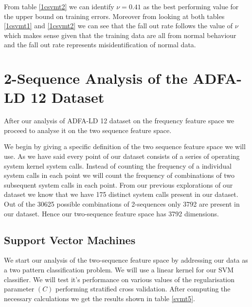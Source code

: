 \documentclass[reqno,openany,12pt]{amsbook}
\begin{document}
From table \ref{1csvmt2} we can identify $\nu=0.41$ as the best performing value for the upper bound on training errors. Moreover from looking at both tables \ref{1csvmt1} and \ref{1csvmt2} we can see that the fall out rate follows the value of $\nu$ which makes sense given that the training data are all from normal behaviour and the fall out rate represents misidentification of normal data.



\chapter{2-Sequence Analysis of the ADFA-LD 12 Dataset}

After our analysis of ADFA-LD 12 dataset on the frequency feature space we proceed to analyse it on the two sequence feature space. 

We begin by giving a specific definition of the two sequence feature space we will use. As we have said every point of our dataset consists of a series of operating system kernel system calls. Instead of counting the frequency of a individual system calls in each point we will count the frequency of combinations of two subsequent system calls in each point. From our previous explorations of our dataset we know that we have 175 distinct system calls present in our dataset. Out of the 30625 possible combinations of 2-sequences only 3792 are present in our dataset. Hence our two-sequence feature space has 3792 dimensions.



\section{Support Vector Machines}

We start our analysis of the two-sequence feature space by addressing our data as a two pattern classification problem. We will use a linear kernel for our SVM classifier. We will test it's performance on various values of the regularisation parameter $(C)$ performing stratified cross validation. After computing the necessary calculations we get the results shown in table \ref{svmt5}.
\end{document}
